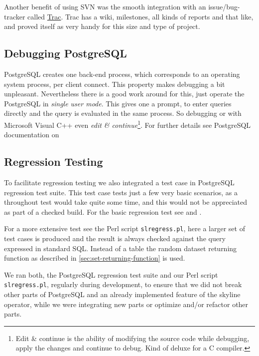 Another benefit of using SVN was the smooth integration with an
issue/bug-tracker called \href{http://trac.edgewall.org/}{Trac}.  Trac
has a wiki, milestones, all kinds of reports and that like, and
proved itself as very handy for this size and type of project.

\subsection{Debugging PostgreSQL}
PostgreSQL creates one back-end process, which corresponds to an
operating system process, per client connect.  This property makes
debugging a bit unpleasant.  Nevertheless there is a good work around
for this, just operate the PostgreSQL in \emph{single user
mode}.  This gives one a prompt, to enter
queries directly and the query is evaluated in the same process.  So
debugging or with Microsoft Visual C++ even \emph{edit \&
continue}\footnote{Edit \& continue is the
ability of modifying the source code while debugging, apply the changes
and continue to debug.  Kind of deluxe for a C compiler.}.  For further
details see PostgreSQL documentation on

\subsection{Regression Testing}
To facilitate regression testing we also integrated a test case in
PostgreSQL regression test suite.  This test case tests just a few
very basic scenarios, as a throughout test would take quite some time,
and this would not be appreciated as part of a checked build.  For the
basic regression test see
 and
.

For a more extensive test see the Perl script \texttt{slregress.pl},
here a larger set of test cases is produced and the result is always
checked against the query expressed in standard SQL.  Instead of a
table the random dataset returning function as described in
\autoref{sec:set-returning-function} is used.

We ran both, the PostgreSQL regression test suite and our Perl script
\texttt{slregress.pl}, regularly during development, to ensure that
we did not break other parts of PostgreSQL and an already implemented
feature of the skyline operator, while we were integrating new parts
or optimize and/or refactor other parts.




